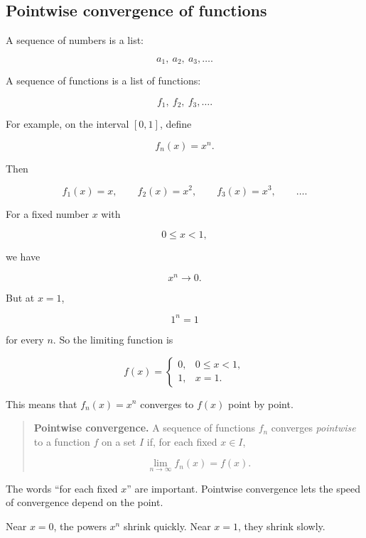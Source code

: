 \subsection{Pointwise convergence of functions}
\label{subsec:pointwise-convergence-functions}

A sequence of numbers is a list:

\[
a_1,\ a_2,\ a_3,\ldots.
\]

A sequence of functions is a list of functions:

\[
f_1,\ f_2,\ f_3,\ldots.
\]

For example, on the interval \([0,1]\), define

\[
f_n(x)=x^n.
\]

Then

\[
f_1(x)=x,\qquad
f_2(x)=x^2,\qquad
f_3(x)=x^3,\qquad \ldots.
\]

For a fixed number \(x\) with

\[
0\le x<1,
\]

we have

\[
x^n\to0.
\]

But at \(x=1\),

\[
1^n=1
\]

for every \(n\).  So the limiting function is

\[
f(x)=
\begin{cases}
0, & 0\le x<1,\\
1, & x=1.
\end{cases}
\]

This means that \(f_n(x)=x^n\) converges to \(f(x)\) point by point.

\begin{quote}
\textbf{Pointwise convergence.}
A sequence of functions \(f_n\) converges \emph{pointwise} to a function \(f\) on a set
\(I\) if, for each fixed \(x\in I\),

\[
\lim_{n\to\infty}f_n(x)=f(x).
\]
\end{quote}

The words ``for each fixed \(x\)'' are important.  Pointwise convergence lets the speed
of convergence depend on the point.

Near \(x=0\), the powers \(x^n\) shrink quickly.  Near \(x=1\), they shrink slowly.

